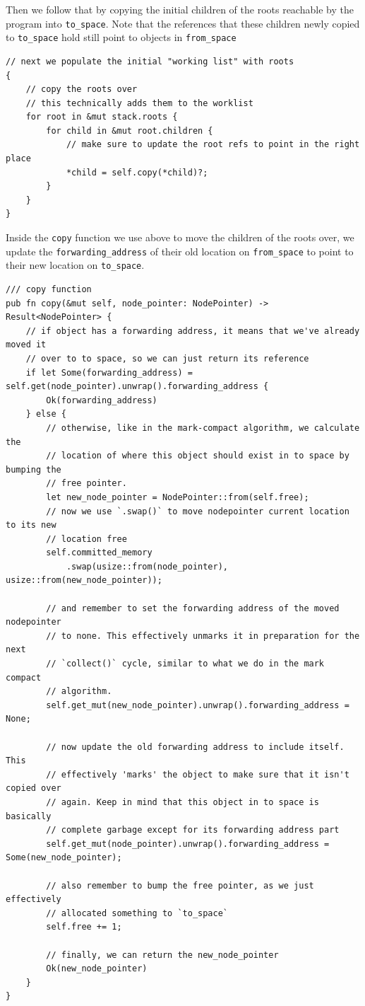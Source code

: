 \documentclass[index]{subfiles}
\begin{document}
Then we follow that by copying the initial children of the roots reachable by the program into \verb+to_space+. Note that the references that these children newly copied to \verb+to_space+ hold still point to objects in \verb+from_space+

\begin{verbatim}
// next we populate the initial "working list" with roots
{
    // copy the roots over
    // this technically adds them to the worklist
    for root in &mut stack.roots {
        for child in &mut root.children {
            // make sure to update the root refs to point in the right place
            *child = self.copy(*child)?;
        }
    }
}
\end{verbatim}

Inside the \verb+copy+ function we use above to move the children of the roots over, we update the \verb+forwarding_address+ of their old location on \verb+from_space+ to point to their new location on \verb+to_space+.

\begin{verbatim}
/// copy function
pub fn copy(&mut self, node_pointer: NodePointer) -> Result<NodePointer> {
    // if object has a forwarding address, it means that we've already moved it
    // over to to space, so we can just return its reference
    if let Some(forwarding_address) = self.get(node_pointer).unwrap().forwarding_address {
        Ok(forwarding_address)
    } else {
        // otherwise, like in the mark-compact algorithm, we calculate the
        // location of where this object should exist in to space by bumping the
        // free pointer.
        let new_node_pointer = NodePointer::from(self.free);
        // now we use `.swap()` to move nodepointer current location to its new
        // location free
        self.committed_memory
            .swap(usize::from(node_pointer), usize::from(new_node_pointer));

        // and remember to set the forwarding address of the moved nodepointer
        // to none. This effectively unmarks it in preparation for the next
        // `collect()` cycle, similar to what we do in the mark compact
        // algorithm.
        self.get_mut(new_node_pointer).unwrap().forwarding_address = None;

        // now update the old forwarding address to include itself. This
        // effectively 'marks' the object to make sure that it isn't copied over
        // again. Keep in mind that this object in to space is basically
        // complete garbage except for its forwarding address part
        self.get_mut(node_pointer).unwrap().forwarding_address = Some(new_node_pointer);

        // also remember to bump the free pointer, as we just effectively
        // allocated something to `to_space`
        self.free += 1;

        // finally, we can return the new_node_pointer
        Ok(new_node_pointer)
    }
}
\end{verbatim}
\end{document}
